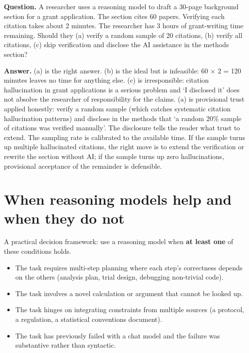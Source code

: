 \documentclass[
  letterpaper,
  11pt]{scrbook}
\providecommand{\tightlist}{%
  \setlength{\itemsep}{0pt}\setlength{\parskip}{0pt}}
\begin{document}
\begin{tcolorbox}[enhanced jigsaw, arc=.35mm, bottomrule=.15mm, bottomtitle=1mm, breakable, colback=white, colbacktitle=quarto-callout-note-color!10!white, colframe=quarto-callout-note-color-frame, coltitle=black, left=2mm, leftrule=.75mm, opacityback=0, opacitybacktitle=0.6, rightrule=.15mm, title={Check your understanding: provisional vs verified}, titlerule=0mm, toprule=.15mm, toptitle=1mm]

\textbf{Question.} A researcher uses a reasoning model to draft a
30-page background section for a grant application. The section cites 60
papers. Verifying each citation takes about 2 minutes. The researcher
has 3 hours of grant-writing time remaining. Should they (a) verify a
random sample of 20 citations, (b) verify all citations, (c) skip
verification and disclose the AI assistance in the methods section?

\textbf{Answer.} (a) is the right answer. (b) is the ideal but is
infeasible: 60 × 2 = 120 minutes leaves no time for anything else. (c)
is irresponsible: citation hallucination in grant applications is a
serious problem and `I disclosed it' does not absolve the researcher of
responsibility for the claims. (a) is provisional trust applied
honestly: verify a random sample (which catches systematic citation
hallucination patterns) and disclose in the methods that `a random 20\%
sample of citations was verified manually'. The disclosure tells the
reader what trust to extend. The sampling rate is calibrated to the
available time. If the sample turns up multiple hallucinated citations,
the right move is to extend the verification or rewrite the section
without AI; if the sample turns up zero hallucinations, provisional
acceptance of the remainder is defensible.

\end{tcolorbox}

\section{When reasoning models help and when they do
not}\label{when-reasoning-models-help-and-when-they-do-not}

A practical decision framework: use a reasoning model when \textbf{at
least one} of these conditions holds.

\begin{itemize}
\tightlist
\item
  The task requires multi-step planning where each step's correctness
  depends on the others (analysis plan, trial design, debugging
  non-trivial code).
\item
  The task involves a novel calculation or argument that cannot be
  looked up.
\item
  The task hinges on integrating constraints from multiple sources (a
  protocol, a regulation, a statistical conventions document).
\item
  The task has previously failed with a chat model and the failure was
  substantive rather than syntactic.
\end{itemize}
\end{document}
